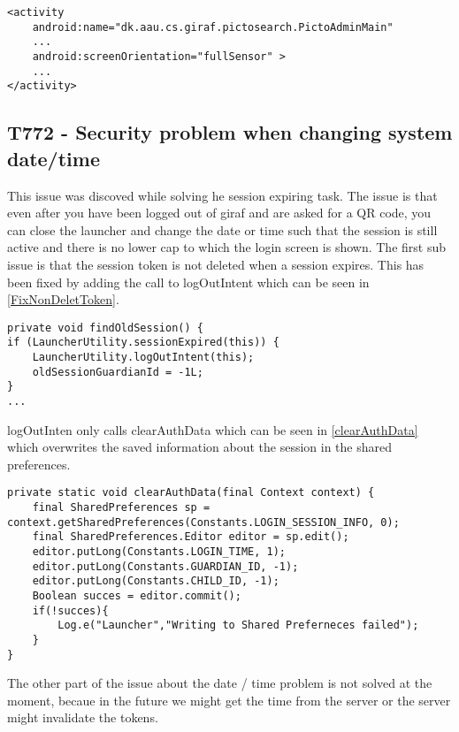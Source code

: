 \begin{minipage}[H]{\linewidth}
\begin{lstlisting}[caption = Allowing changes to the screen orientation., label = OrientAllow] 
<activity
	android:name="dk.aau.cs.giraf.pictosearch.PictoAdminMain"
    ...
    android:screenOrientation="fullSensor" >
    ...
</activity>
\end{lstlisting}
\end{minipage}



\subsection{T772 - Security problem when changing system date/time}\label{T772}
This issue was discoved while solving he session expiring task. The issue is
that even after you have been logged out of giraf and are asked for a QR code,
you can close the launcher and change the date or time such that the session is
still active and there is no lower cap to which the login screen is shown. The
first sub issue is that the session token is not deleted when a session expires.
This has been fixed by adding the call to logOutIntent which can be seen in
\autoref{FixNonDeletToken}.

\begin{minipage}[H]{\linewidth}
\begin{lstlisting}[caption = Our solution to not clearing the token, label =
FixNonDeletToken] 
private void findOldSession() {
if (LauncherUtility.sessionExpired(this)) {
	LauncherUtility.logOutIntent(this);
    oldSessionGuardianId = -1L;
}
...
\end{lstlisting} 
\end{minipage}

logOutInten only calls clearAuthData which can be seen in
\autoref{clearAuthData} which overwrites the saved information about the
session in the shared preferences.

\begin{minipage}[H]{\linewidth}
\begin{lstlisting}[caption = ClearAuthData methode, label = clearAuthData]
private static void clearAuthData(final Context context) {
    final SharedPreferences sp = context.getSharedPreferences(Constants.LOGIN_SESSION_INFO, 0);
    final SharedPreferences.Editor editor = sp.edit();
    editor.putLong(Constants.LOGIN_TIME, 1);
    editor.putLong(Constants.GUARDIAN_ID, -1);
    editor.putLong(Constants.CHILD_ID, -1);
    Boolean succes = editor.commit();
    if(!succes){
    	Log.e("Launcher","Writing to Shared Preferneces failed");
    }
}
\end{lstlisting} 
\end{minipage}

The other part of the issue about the date / time problem is not solved at the
moment, becaue in the future we might get the time from the server or the server
might invalidate the tokens.
























